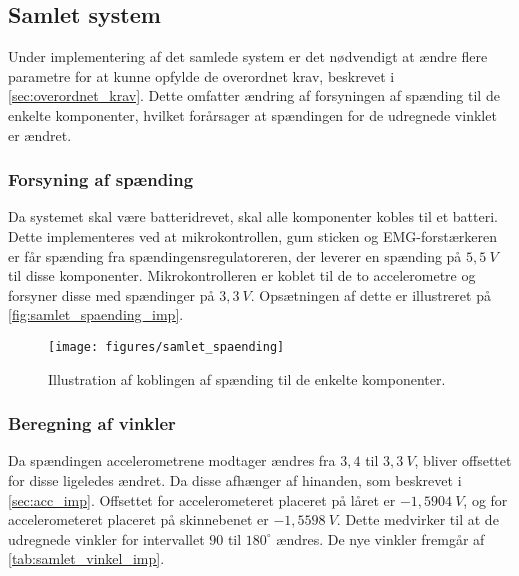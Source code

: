 \subsection{Samlet system}
Under implementering af det samlede system er det nødvendigt at ændre flere parametre for at kunne opfylde de overordnet krav, beskrevet i  \autoref{sec:overordnet_krav}. Dette omfatter ændring af forsyningen af spænding til de enkelte komponenter, hvilket forårsager at spændingen for de udregnede vinklet er ændret.

\subsubsection{Forsyning af spænding}
Da systemet skal være batteridrevet, skal alle komponenter kobles til et batteri. Dette implementeres ved at mikrokontrollen, gum sticken og EMG-forstærkeren er får spænding fra spændingensregulatoreren, der leverer en spænding på $5,5~V$ til disse komponenter. Mikrokontrolleren er koblet til de to accelerometre og forsyner disse med spændinger på $3,3~V$. Opsætningen af dette er illustreret på \autoref{fig:samlet_spaending_imp}. 

\begin{figure}[H]
\centering
\texttt{[image: figures/samlet\_spaending]}
\caption{Illustration af koblingen af spænding til de enkelte komponenter.}
\label{fig:samlet_spaending_imp}
\end{figure}

\subsubsection{Beregning af vinkler}
Da spændingen accelerometrene modtager ændres fra $3,4$ til $3,3~V$, bliver offsettet for disse ligeledes ændret. Da disse afhænger af hinanden, som  beskrevet i \autoref{sec:acc_imp}. Offsettet for accelerometeret placeret på låret er $-1,5904~V$, og for accelerometeret placeret på skinnebenet er $-1,5598~V$. Dette medvirker til at de udregnede vinkler for intervallet $90$ til $180^{\circ}$ ændres. De nye vinkler fremgår af \autoref{tab:samlet_vinkel_imp}. 

